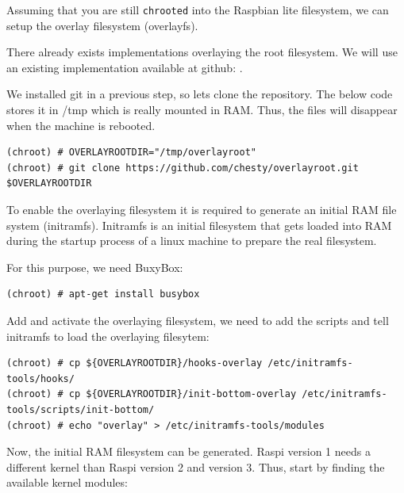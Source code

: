 Assuming that you are still \texttt{chrooted} into the Raspbian lite filesystem, we
can setup the overlay filesystem (overlayfs).

There already exists implementations overlaying the root filesystem. We will
use an existing implementation
available at github: \cite{overlayroot}.

We installed git in a previous step, so lets clone the repository. The below
code stores it in /tmp which is really mounted in \ac{RAM}. Thus, the files
will disappear when the machine is rebooted.

\begin{lstlisting}[]
(chroot) # OVERLAYROOTDIR="/tmp/overlayroot"
(chroot) # git clone https://github.com/chesty/overlayroot.git $OVERLAYROOTDIR
\end{lstlisting}
\FloatBarrier
\vspace{-5mm}

To enable the overlaying filesystem it is required to generate an initial \ac{RAM}
file system (initramfs). Initramfs is an initial filesystem that gets loaded into
\ac{RAM} during the startup process of a linux machine to prepare the real
filesystem.

For this purpose, we need BuxyBox:

\begin{lstlisting}[]
(chroot) # apt-get install busybox
\end{lstlisting}
\FloatBarrier
\vspace{-5mm}

Add and activate the overlaying filesystem, we need to add the scripts and tell initramfs
to load the overlaying filesytem:

\begin{lstlisting}[]
(chroot) # cp ${OVERLAYROOTDIR}/hooks-overlay /etc/initramfs-tools/hooks/
(chroot) # cp ${OVERLAYROOTDIR}/init-bottom-overlay /etc/initramfs-tools/scripts/init-bottom/
(chroot) # echo "overlay" > /etc/initramfs-tools/modules
\end{lstlisting}
\FloatBarrier
\vspace{-5mm}

Now, the initial \ac{RAM} filesystem can be generated. \ac{Raspi} version 1
needs a different kernel than \ac{Raspi} version 2 and version 3. Thus, start
by finding the available kernel modules:


